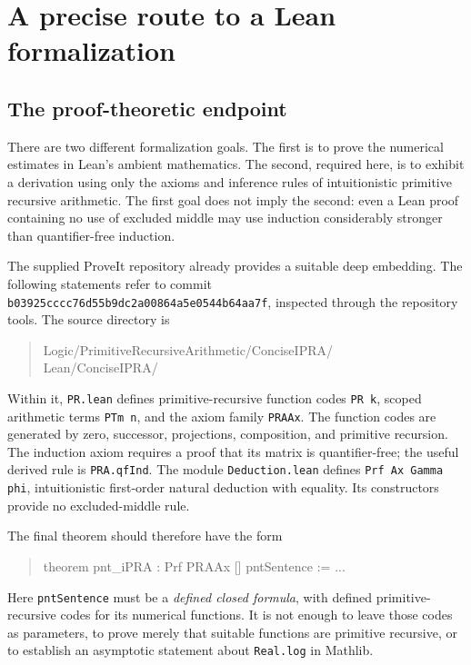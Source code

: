 \section{A precise route to a Lean formalization}
\label{sec:lean-plan}

\subsection{The proof-theoretic endpoint}

There are two different formalization goals.  The first is to prove the
numerical estimates in Lean's ambient mathematics.  The second, required
here, is to exhibit a derivation using only the axioms and inference rules
of intuitionistic primitive recursive arithmetic.  The first goal does not
imply the second: even a Lean proof containing no use of excluded middle
may use induction considerably stronger than quantifier-free induction.

The supplied ProveIt repository already provides a suitable deep embedding.
The following statements refer to commit
\texttt{b03925cccc76d55b9dc2a00864a5e0544b64aa7f}, inspected through the
repository tools.  The source directory is
\begin{quote}\small\ttfamily
Logic/PrimitiveRecursiveArithmetic/ConciseIPRA/\\
Lean/ConciseIPRA/
\end{quote}
Within it, \texttt{PR.lean} defines primitive-recursive function codes
\texttt{PR k}, scoped arithmetic terms \texttt{PTm n}, and the axiom family
\texttt{PRAAx}.  The function codes are generated by zero, successor,
projections, composition, and primitive recursion.  The induction axiom
requires a proof that its matrix is quantifier-free; the useful derived
rule is \texttt{PRA.qfInd}.  The module \texttt{Deduction.lean} defines
\texttt{Prf Ax Gamma phi}, intuitionistic first-order natural deduction
with equality.  Its constructors provide no excluded-middle rule.

The final theorem should therefore have the form
\begin{quote}\ttfamily
theorem pnt\_iPRA : Prf PRAAx [] pntSentence := ...
\end{quote}
Here \texttt{pntSentence} must be a \emph{defined closed formula}, with
defined primitive-recursive codes for its numerical functions.  It is not
enough to leave those codes as parameters, to prove merely that suitable
functions are primitive recursive, or to establish an asymptotic statement
about \texttt{Real.log} in Mathlib.

